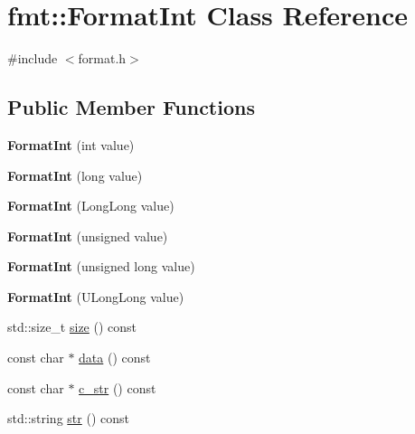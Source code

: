 \hypertarget{classfmt_1_1FormatInt}{}\section{fmt\+:\+:Format\+Int Class Reference}
\label{classfmt_1_1FormatInt}


{\ttfamily \#include $<$format.\+h$>$}

\subsection*{Public Member Functions}
\begin{DoxyCompactItemize}
\item 
{\bfseries Format\+Int} (int value)\hypertarget{classfmt_1_1FormatInt_a9ea696341b1f8be23c41885c1bfb1395}{}\label{classfmt_1_1FormatInt_a9ea696341b1f8be23c41885c1bfb1395}

\item 
{\bfseries Format\+Int} (long value)\hypertarget{classfmt_1_1FormatInt_afba7a9464d4b9d70a877b38f09b66a30}{}\label{classfmt_1_1FormatInt_afba7a9464d4b9d70a877b38f09b66a30}

\item 
{\bfseries Format\+Int} (Long\+Long value)\hypertarget{classfmt_1_1FormatInt_af1e95a3f28e4905ed901beb1df3d77e2}{}\label{classfmt_1_1FormatInt_af1e95a3f28e4905ed901beb1df3d77e2}

\item 
{\bfseries Format\+Int} (unsigned value)\hypertarget{classfmt_1_1FormatInt_a6bbe09f7223c6489272ae295330c145c}{}\label{classfmt_1_1FormatInt_a6bbe09f7223c6489272ae295330c145c}

\item 
{\bfseries Format\+Int} (unsigned long value)\hypertarget{classfmt_1_1FormatInt_a376433048225d105887f0a151126c134}{}\label{classfmt_1_1FormatInt_a376433048225d105887f0a151126c134}

\item 
{\bfseries Format\+Int} (U\+Long\+Long value)\hypertarget{classfmt_1_1FormatInt_ace4887e009064bcea8eea9bb6e30026e}{}\label{classfmt_1_1FormatInt_ace4887e009064bcea8eea9bb6e30026e}

\item 
std\+::size\+\_\+t \hyperlink{classfmt_1_1FormatInt_ad09445e55ae7c8944b5275a54a03da14}{size} () const 
\item 
const char $\ast$ \hyperlink{classfmt_1_1FormatInt_a3cad581dde135c51390fd4ebd18d6d1b}{data} () const 
\item 
const char $\ast$ \hyperlink{classfmt_1_1FormatInt_a58a17394f4f8e63debb91b90aa0dea0c}{c\+\_\+str} () const 
\item 
std\+::string \hyperlink{classfmt_1_1FormatInt_adfd4854a5efceb8df461a521c3eda5ef}{str} () const 
\end{DoxyCompactItemize}


